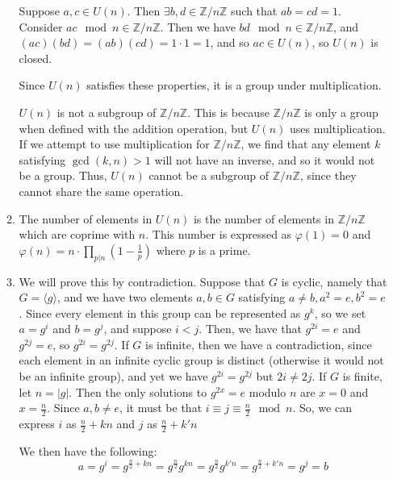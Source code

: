 \documentclass{article}
\begin{document}
\begin{enumerate}
\begin{enumerate}
            \smallskip

            Suppose $a, c \in U(n)$. Then $\exists b, d \in \mathbb{Z}/n\mathbb{Z}$ such that $ab = cd = 1$. Consider $ac \mod n \in \mathbb{Z}/n\mathbb{Z}$. Then we have $bd \mod n\in \mathbb{Z}/n\mathbb{Z}$, and $(ac)(bd) = (ab)(cd) = 1 \cdot 1 = 1$, and so $ac \in U(n)$, so $U(n)$ is closed.  

            \smallskip

            Since $U(n)$ satisfies these properties, it is a group under multiplication. 

            \smallskip

            $U(n)$ is not a subgroup of $\mathbb{Z}/n\mathbb{Z}$. This is because $\mathbb{Z}/n\mathbb{Z}$ is only a group when defined with the addition operation, but $U(n)$ uses multiplication. If we attempt to use multiplication for $\mathbb{Z}/n\mathbb{Z}$, we find that any element $k$ satisfying $\gcd(k, n) > 1$ will not have an inverse, and so it would not be a group. Thus, $U(n)$ cannot be a subgroup of $\mathbb{Z}/n\mathbb{Z}$, since they cannot share the same operation. 

            \item The number of elements in $U(n)$ is the number of elements in $\mathbb{Z}/n\mathbb{Z}$ which are coprime with $n$. This number is expressed as $\varphi(1) = 0$ and $\varphi(n) = n \cdot \prod_{p|n}\left(1 - \frac{1}{p}\right)$ where $p$ is a prime. 

            \item We will prove this by contradiction. Suppose that $G$ is cyclic, namely that $G = \langle g\rangle$, and we have two elements $a, b \in G$ satisfying $a \neq b, a^2 = e, b^2 = e$. Since every element in this group can be represented as $g^k$, so we set $a = g^i$ and $b = g^j$, and suppose $i < j$. Then, we have that $g^{2i} = e$ and $g^{2j} = e$, so $g^{2i} = g^{2j}$. If $G$ is infinite, then we have a contradiction, since each element in an infinite cyclic group is distinct (otherwise it would not be an infinite group), and yet we have $g^{2i} = g^{2j}$ but $2i \neq 2j$. If $G$ is finite, let $n = |g|$. Then the only solutions to $g^{2x} = e$ modulo $n$ are $x = 0$ and $x = \frac{n}{2}$. Since $a, b \neq e$, it must be that $i \equiv j \equiv \frac{n}{2} \mod n$. So, we can express $i$ as $\frac{n}{2} + kn$ and $j$ as $\frac{n}{2} + k'n$
            
            We then have the following: $$a =  g^i= g^{\frac{n}{2} + kn} = g^{\frac{n}{2}}g^{kn} = g^{\frac{n}{2}}g^{k'n} = g^{\frac{n}{2} + k'n} = g^{j} = b$$ 
            

\end{enumerate}
\end{enumerate}
\end{document}

